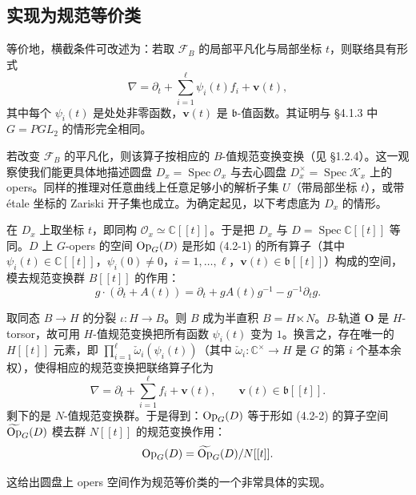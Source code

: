 \subsection{实现为规范等价类}

等价地，横截条件可改述为：若取 $\mathcal{F}_B$ 的局部平凡化与局部坐标 $t$，则联络具有形式
\begin{equation}
    \nabla=\partial_t+\sum_{i=1}^{\ell}\psi_i(t)f_i+\mathbf{v}(t),
    \tag{4.2-1}
\end{equation}
其中每个 $\psi_i(t)$ 是处处非零函数，$\mathbf{v}(t)$ 是 $\mathfrak{b}$-值函数。其证明与 §4.1.3 中 $G=PGL_2$ 的情形完全相同。

若改变 $\mathcal{F}_B$ 的平凡化，则该算子按相应的 $B$-值规范变换变换（见 §1.2.4）。这一观察使我们能更具体地描述圆盘 $D_x=\operatorname{Spec}\mathcal{O}_x$ 与去心圆盘 $D_x^\times=\operatorname{Spec}\mathcal{K}_x$ 上的 opers。同样的推理对任意曲线上任意足够小的解析子集 $U$（带局部坐标 $t$），或带 étale 坐标的 Zariski 开子集也成立。为确定起见，以下考虑底为 $D_x$ 的情形。

在 $D_x$ 上取坐标 $t$，即同构 $\mathcal{O}_x\simeq\mathbb{C}[[t]]$。于是把 $D_x$ 与 $D=\operatorname{Spec}\mathbb{C}[[t]]$ 等同。$D$ 上 $G$-opers 的空间 $\operatorname{Op}_G(D)$ 是形如 (4.2-1) 的所有算子（其中 $\psi_i(t)\in\mathbb{C}[[t]]$，$\psi_i(0)\ne0$，$i=1,\dots,\ell$，$\mathbf{v}(t)\in\mathfrak{b}[[t]]$）构成的空间，模去规范变换群 $B[[t]]$ 的作用：
\[
    g\cdot(\partial_t+A(t))=\partial_t+gA(t)g^{-1}-g^{-1}\partial_t g.
\]

取同态 $B\to H$ 的分裂 $\iota:H\to B$。则 $B$ 成为半直积 $B=H\ltimes N$。$B$-轨道 $\mathbf{O}$ 是 $H$-torsor，故可用 $H$-值规范变换把所有函数 $\psi_i(t)$ 变为 $1$。换言之，存在唯一的 $H[[t]]$ 元素，即 $\prod_{i=1}^{\ell}\check{\omega}_i(\psi_i(t))$（其中 $\check{\omega}_i:\mathbb{C}^\times\to H$ 是 $G$ 的第 $i$ 个基本余权），使得相应的规范变换把联络算子化为
\begin{equation}
    \nabla=\partial_t+\sum_{i=1}^{\ell}f_i+\mathbf{v}(t),\qquad\mathbf{v}(t)\in\mathfrak{b}[[t]].
    \tag{4.2-2}
\end{equation}
剩下的是 $N$-值规范变换群。于是得到：$\operatorname{Op}_G(D)$ 等于形如 (4.2-2) 的算子空间 $\widetilde{\operatorname{Op}}_G(D)$ 模去群 $N[[t]]$ 的规范变换作用：
\[
    \operatorname{Op}_G(D)=\widetilde{\operatorname{Op}}_G(D)/N[[t]].
\]

这给出圆盘上 opers 空间作为规范等价类的一个非常具体的实现。

